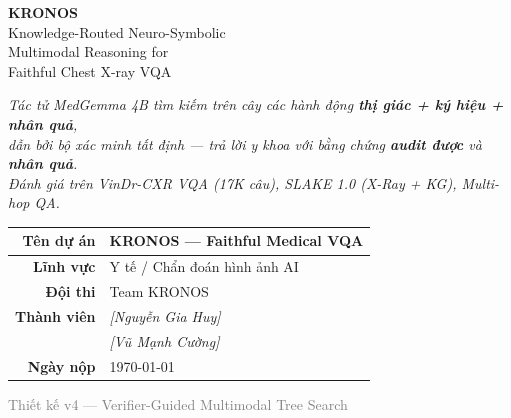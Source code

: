 \documentclass[11pt,a4paper]{article}
\begin{document}
\begin{titlepage}
\begin{center}

\vspace*{1.5cm}

{\Huge\bfseries\textcolor{kronblue}{KRONOS}}\\[0.5cm]
{\Large\textcolor{krondark}{Knowledge-Routed Neuro-Symbolic}}\\[0.2cm]
{\Large\textcolor{krondark}{Multimodal Reasoning for}}\\[0.2cm]
{\Large\textcolor{krondark}{Faithful Chest X-ray VQA}}\\[1.5cm]

\begin{highlightbox}
\centering
\textit{Tác tử MedGemma 4B tìm kiếm trên cây các hành động \textbf{thị giác + ký hiệu + nhân quả},\\
dẫn bởi bộ xác minh tất định --- trả lời y khoa với bằng chứng \textbf{audit được} và \textbf{nhân quả}.\\[4pt]
Đánh giá trên VinDr-CXR VQA (17K câu), SLAKE 1.0 (X-Ray + KG), Multi-hop QA.}
\end{highlightbox}

\vspace{1.5cm}

\begin{tabular}{rl}
\toprule
\textbf{Tên dự án} & KRONOS — Faithful Medical VQA \\
\midrule
\textbf{Lĩnh vực}  & Y tế / Chẩn đoán hình ảnh AI \\
\textbf{Đội thi}   & Team KRONOS \\
\textbf{Thành viên} & \textit{[Nguyễn Gia Huy]} \\
                    & \textit{[Vũ Mạnh Cường]} \\
\textbf{Ngày nộp}   & \today \\
\bottomrule
\end{tabular}

\vfill

{\small\textcolor{gray}{Thiết kế v4 — Verifier-Guided Multimodal Tree Search}}

\end{center}
\end{titlepage}

\tableofcontents
\newpage
\end{document}
